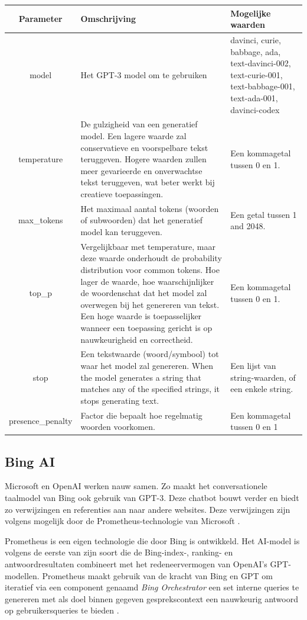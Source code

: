 \begin{tabular}{|c|p{7cm}|p{5cm}|}
	\hline
	Parameter & Omschrijving & Mogelijke waarden \\
	\hline
	model & Het GPT-3 model om te gebruiken & davinci, curie, babbage, ada, text-davinci-002, text-curie-001, text-babbage-001, text-ada-001, davinci-codex \\
	\hline
	temperature & De gulzigheid van een generatief model. Een lagere waarde zal conservatieve en voorspelbare tekst teruggeven. Hogere waarden zullen meer gevarieerde en onverwachtse tekst teruggeven, wat beter werkt bij creatieve toepassingen. & Een kommagetal tussen 0 en 1. \\
	\hline
	max\_tokens & Het maximaal aantal tokens (woorden of subwoorden) dat het generatief model kan teruggeven. & Een getal tussen 1 and 2048. \\
	\hline
	top\_p & Vergelijkbaar met temperature, maar deze waarde onderhoudt de probability distribution voor common tokens. Hoe lager de waarde, hoe waarschijnlijker de woordenschat dat het model zal overwegen bij het genereren van tekst. Een hoge waarde is toepasselijker wanneer een toepassing gericht is op nauwkeurigheid en correctheid. & Een kommagetal tussen 0 en 1. \\
	\hline
	stop & Een tekstwaarde (woord/symbool) tot waar het model zal genereren. When the model generates a string that matches any of the specified strings, it stops generating text. & Een lijst van string-waarden, of een enkele string. \\
	\hline
	presence\_penalty & Factor die bepaalt hoe regelmatig woorden voorkomen. & Een kommagetal tussen 0 en 1 \\
	\hline
\end{tabular}

\subsection{Bing AI}


Microsoft en OpenAI werken nauw samen. Zo maakt het conversationele taalmodel van Bing ook gebruik van GPT-3. Deze chatbot bouwt verder en biedt zo verwijzingen en referenties aan naar andere websites. Deze verwijzingen zijn volgens mogelijk door de Prometheus-technologie van Microsoft \autocite{Ribas2023}.

Prometheus is een eigen technologie die door Bing is ontwikkeld. Het AI-model is volgens \textcite{Ribas2023} de eerste van zijn soort die de Bing-index-, ranking- en antwoordresultaten combineert met het redeneervermogen van OpenAI’s GPT-modellen. Prometheus maakt gebruik van de kracht van Bing en GPT om iteratief via een component genaamd \textit{Bing Orchestrator} een set interne queries te genereren met als doel binnen gegeven gesprekscontext een nauwkeurig antwoord op gebruikersqueries te bieden \autocite{Ribas2023}.

